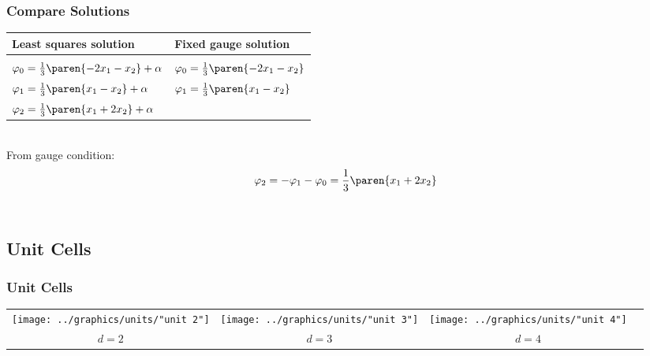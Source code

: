 \documentclass[handout]{beamer}
\begin{document}
\begin{frame}      %
\frametitle{Compare Solutions}
    \begin{table}[htdp]
        \begin{center}
            \begin{tabular}{ll}
              Least squares solution & Fixed gauge solution \\\hline
              \\
              $\varphi_{0} = \frac{1}{3} \paren{ -2x_{1} - x_{2} } + \alpha$ & $\varphi_{0} = \frac{1}{3} \paren{ -2x_{1} - x_{2} }$ \\[10pt]
              $\varphi_{1} = \frac{1}{3} \paren{ x_{1} - x_{2} } + \alpha$ & $\varphi_{1} = \frac{1}{3} \paren{ x_{1} - x_{2} }$ \\[10pt]
              $\varphi_{2} = \frac{1}{3} \paren{ x_{1} + 2 x_{2} } + \alpha$
            \end{tabular}
        \end{center}
    \end{table}%
  \pause
  \ \\[10pt]
  From gauge condition:
  $$\varphi_{2} = -\varphi_{1} -\varphi_{0} = \frac{1}{3} \paren{ x_{1} + 2 x_{2} }$$ \\
  \twodots
\end{frame}

\subsection{Unit Cells}

\begin{frame}      %
\frametitle{Unit Cells}
  \begin{table}[htdp]
    \begin{center}
      \begin{tabular}{cccc}
        \texttt{[image: ../graphics/units/"unit 2"]} &
        \texttt{[image: ../graphics/units/"unit 3"]} &
        \texttt{[image: ../graphics/units/"unit 4"]} \\
        $d = 2$ &
        $d = 3$ &
        $d = 4$
      \end{tabular}
    \end{center}
  \end{table}%
\end{frame}
\end{document}
